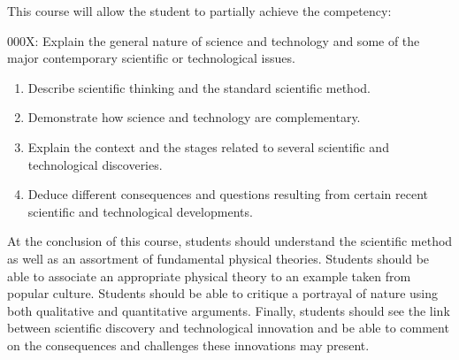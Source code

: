 {This course will allow the student to partially achieve the competency:

000X: Explain the general nature of science and technology and some of the major contemporary scientific or technological issues.
\begin{enumerate}
	\item Describe scientific thinking and the standard scientific method.
	\item Demonstrate how science and technology are complementary.
	\item Explain the context and the stages related to several scientific and technological discoveries.
	\item Deduce different consequences and questions resulting from certain recent scientific and technological developments.
\end{enumerate}

At the conclusion of this course, students should understand the scientific method as well as an assortment of fundamental physical theories. Students should be able to associate an appropriate physical theory to an example taken from popular culture. Students should be able to critique a portrayal of nature using both qualitative and quantitative arguments. Finally, students should see the link between scientific discovery and technological innovation and be able to comment on the consequences and challenges these innovations may present.}
